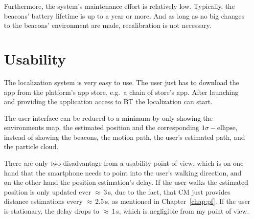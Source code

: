 Furthermore, the system's maintenance effort is relatively low. Typically, the beacons' battery lifetime is up to a year or more. And as long as no big changes to the beacons' environment are made, recalibration is not necessary.

\section{Usability}
The localization system is very easy to use. The user just has to download the app from the platform's app store, e.g.\ a chain of store's app. After launching and providing the application access to \acl{BT} the localization can start.

The user interface can be reduced to a minimum by only showing the environments map, the estimated position and the corresponding $1\sigma-\text{ellipse}$, instead of showing the beacons, the motion path, the user's estimated path, and the particle cloud.

There are only two disadvantage from a usability point of view, which is on one hand that the smartphone needs to point into the user's walking direction, and on the other hand the position estimation's delay. If the user walks the estimated position is only updated ever $\approx$\,3\,s, due to the fact, that \acs{CM} just provides distance estimations every $\approx$\,2.5\,s, as mentioned in Chapter~\ref{chap:pf}. If the user is stationary, the delay drops to $\approx$\,1\,s, which is negligible from my point of view.
